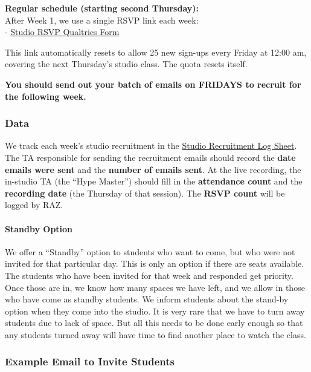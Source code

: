 \documentclass[
]{article}
\begin{document}
\textbf{Regular schedule (starting second Thursday):}\\
After Week 1, we use a single RSVP link each week:\\
- \href{https://utexas.qualtrics.com/jfe/form/SV_1RDMx9U8zFq3oFg}{Studio RSVP Qualtrics Form}

This link automatically resets to allow 25 new sign-ups every Friday at 12:00 am, covering the next Thursday's studio class. The quota resets itself.

\textbf{You should send out your batch of emails on FRIDAYS to recruit for the following week.}

\hypertarget{data}{%
\subsubsection{Data}\label{data}}

We track each week's studio recruitment in the \href{https://docs.google.com/spreadsheets/d/1c99r7PZXdpGsK9qJI7nqpL0r9CE9qULdytwzmRFdW9o/edit?usp=sharing}{Studio Recruitment Log Sheet}. The TA responsible for sending the recruitment emails should record the \textbf{date emails were sent} and the \textbf{number of emails sent}. At the live recording, the in-studio TA (the ``Hype Master'') should fill in the \textbf{attendance count} and the \textbf{recording date} (the Thursday of that session). The \textbf{RSVP count} will be logged by RAZ.

\hypertarget{standby-option}{%
\paragraph{Standby Option}\label{standby-option}}

We offer a ``Standby'' option to students who want to come, but who were not invited for that particular day. This is only an option if there are seats available. The students who have been invited for that week and responded get priority. Once those are in, we know how many spaces we have left, and we allow in those who have come as standby students. We inform students about the stand-by option when they come into the studio. It is very rare that we have to turn away students due to lack of space. But all this needs to be done early enough so that any students turned away will have time to find another place to watch the class.

\hypertarget{example-email-to-invite-students}{%
\subsubsection{Example Email to Invite Students}\label{example-email-to-invite-students}}
\end{document}
